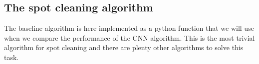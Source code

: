 \documentclass[letterpaper,10pt,english]{sphinxmanual}
\begin{document}
\begin{sphinxVerbatim}[commandchars=\\\{\}]
\PYG{p}{[}\PYG{p}{]}\PYG{p}{[}\PYG{p}{]}\PYG{p}{[}\PYG{p}{]}
\PYG{p}{[}\PYG{p}{]}\PYG{p}{[}\PYG{p}{]}\PYG{p}{[}\PYG{p}{]}
\end{sphinxVerbatim}

\noindent{}


\subsection{The spot cleaning algorithm}
\label{\detokenize{ML4NeutronImageSegmentation:the-spot-cleaning-algorithm}}
The baseline algorithm is here implemented as a python function that we will use when we compare the performance of the CNN algorithm. This is the most trivial algorithm for spot cleaning and there are plenty other algorithms to solve this task.
\end{document}
